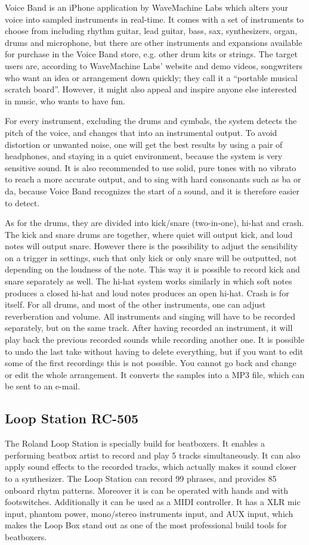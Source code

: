 Voice Band is an iPhone application by WaveMachine Labs which alters your voice into sampled instruments in real-time. It comes with a set of instruments to choose from including rhythm guitar, lead guitar, bass, sax, synthesizers, organ, drums and microphone, but there are other instruments and expansions available for purchase in the Voice Band store, e.g. other drum kits or strings. The target users are, according to WaveMachine Labs’ website and demo videos, songwriters who want an idea or arrangement down quickly; they call it a “portable musical scratch board”. However, it might also appeal and inspire anyone else interested in music, who wants to have fun. 

For every instrument, excluding the drums and cymbals, the system detects the pitch of the voice, and changes that into an instrumental output. To avoid distortion or unwanted noise, one will get the best results by using a pair of headphones, and staying in a quiet environment, because the system is very sensitive sound. It is also recommended to use solid, pure tones with no vibrato to reach a more accurate output, and to sing with hard consonants such as ba or da, because Voice Band recognizes the start of a sound, and it is therefore easier to detect.  

As for the drums, they are divided into kick/snare (two-in-one), hi-hat and crash. The kick and snare drums are together, where quiet will output kick, and loud notes will output snare. However there is the possibility to adjust the sensibility on a trigger in settings, such that only kick or only snare will be outputted, not depending on the loudness of the note. This way it is possible to record kick and snare separately as well. The hi-hat system works similarly in which soft notes produces a closed hi-hat and loud notes produces an open hi-hat. Crash is for itself. For all drums, and most of the other instruments, one can adjust reverberation and volume. 
All instruments and singing will have to be recorded separately, but on the same track. After having recorded an instrument, it will play back the previous recorded sounds while recording another one. It is possible to undo the last take without having to delete everything, but if you want to edit some of the first recordings this is not possible.  You cannot go back and change or edit the whole arrangement. It converts the samples into a MP3 file, which can be sent to an e-mail. 

\subsection{ Loop Station RC-505 }
The Roland Loop Station is specially build for beatboxers. It enables a performing beatbox artist to record and play 5 tracks simultaneously. It can also apply sound effects to the recorded tracks, which actually makes it sound closer to a synthesizer. The Loop Station can record 99 phrases, and provides 85 onboard rhytm patterns. Moreover it is can be operated with hands and with footswitches. Additionally it can be used as a MIDI controller. It has a XLR mic input, phantom power, mono/stereo instruments input, and AUX input, which makes the Loop Box stand out as one of the most professional build tools for beatboxers.

